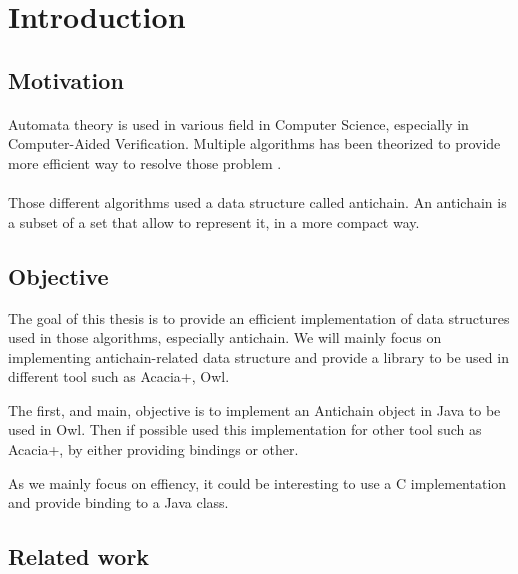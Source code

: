 \documentclass[letterpaper]{article}
\begin{document}
\section{Introduction}


\subsection{Motivation}

\paragraph{}


Automata theory is used in various field in Computer Science, especially
in Computer-Aided Verification. Multiple algorithms has been theorized
to provide more efficient way to resolve those problem
.


\paragraph{}

Those different algorithms used a data structure called antichain.
An antichain is a subset of a set that allow to represent it, in a more
compact way.

\subsection{Objective}

The goal of this thesis is to provide an efficient implementation of
data structures used in those algorithms, especially antichain. We will
mainly focus on implementing antichain-related data structure and provide
a library to be used in different tool such as Acacia+, Owl.

The first, and main, objective is to implement an Antichain object
in Java to be used in Owl. Then if possible used this implementation
for other tool such as Acacia+, by either providing bindings or other.

As we mainly focus on effiency, it could be interesting to use a C
implementation and provide binding to a Java class.

\subsection{Related work}
\end{document}
